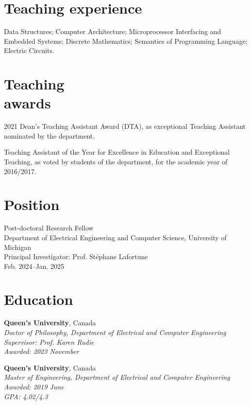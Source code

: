 \documentclass[margin]{res}
\begin{document}
\begin{resume}
\section{Teaching experience}
Data Structures;
Computer Architecture;
Microprocessor Interfacing and Embedded Systems;
Discrete Mathematics;
Semantics of Programming Language;
Electric Circuits.

\section{Teaching\\awards}
2021 Dean's Teaching Assistant Award (DTA), as exceptional Teaching Assistant nominated by the department.

Teaching Assistant of the Year for Excellence in Education and Exceptional Teaching, as voted by students of the department, for the academic year of 2016/2017.

\section{Position}

Post-doctoral Research Fellow\\
Department of Electrical Engineering and Computer Science, University of Michigan\\
Principal Investigator: Prof. Stéphane Lafortune\\
\null\qquad Feb. 2024--Jan. 2025


\section{Education}
\textbf{Queen's University}, Canada\\
{\sl Doctor of Philosophy, Department of Electrical and Computer Engineering\\
Supervisor: Prof. Karen Rudie\\
Awarded:
\hfill 2023 November}


\textbf{Queen's University}, Canada\\
{\sl Master of Engineering, Department of Electrical and Computer Engineering\\
Awarded:
\hfill 2019 June\\
GPA:
\hfill 4.02/4.3}


\end{resume}
\end{document}
